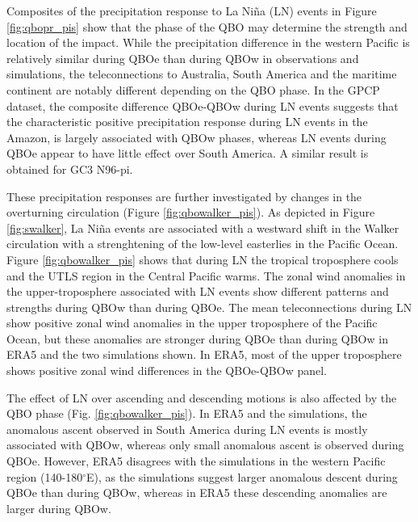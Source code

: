 Composites of the precipitation response to La Niña (LN) events in Figure \ref{fig:qbopr_pis} show that the phase of the QBO may determine the strength and location of the impact. 
While the precipitation difference in the western Pacific is relatively similar during QBOe than during QBOw in observations and simulations, the teleconnections to Australia, South America and the maritime continent are notably different depending on the QBO phase. 
In the GPCP dataset, the composite difference QBOe-QBOw during LN events suggests that the characteristic positive precipitation response during LN events in the Amazon, is largely associated with QBOw phases, whereas LN events during QBOe appear to have little effect over South America. 
A similar result is obtained for GC3 N96-pi. 

These precipitation responses are further investigated by changes in the overturning circulation (Figure \ref{fig:qbowalker_pis}). As depicted in Figure \ref{fig:swalker}, La Niña events are associated with a westward shift in the Walker circulation with a strenghtening of the low-level easterlies in the Pacific Ocean. 
Figure \ref{fig:qbowalker_pis} shows that during LN the tropical troposphere cools and the UTLS region in the Central Pacific warms. %
The zonal wind anomalies in the upper-troposphere associated with LN events show different patterns and strengths during QBOw than during QBOe. The mean teleconnections during LN show positive zonal wind anomalies in the upper troposphere of the Pacific Ocean,  but these anomalies are stronger during QBOe than during QBOw in ERA5 and the two simulations shown. In ERA5, most of the upper troposphere shows positive zonal wind differences in the QBOe-QBOw panel. 


The effect of LN over ascending and descending motions is also affected by the QBO phase (Fig. \ref{fig:qbowalker_pis}). In ERA5 and the simulations, the anomalous ascent observed in South America during LN events is mostly associated with QBOw, whereas only small anomalous ascent is observed during QBOe. 
However, ERA5 disagrees with the simulations in the western Pacific region (140-180$^\circ$E), as the simulations suggest larger anomalous descent during QBOe than during QBOw, whereas in ERA5 these descending anomalies are larger during QBOw. 

